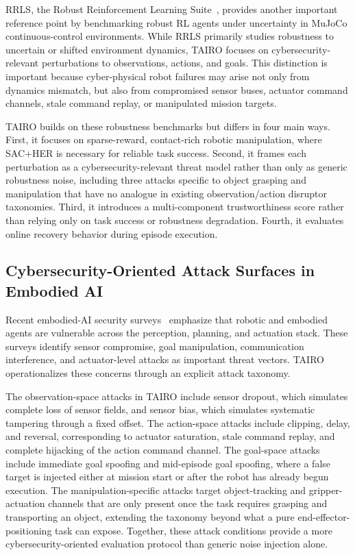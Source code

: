 \documentclass[conference]{IEEEtran}
\begin{document}
RRLS, the Robust Reinforcement Learning Suite~\cite{zouitine2024rrls}, provides another
important reference point by benchmarking robust RL agents under uncertainty in MuJoCo
continuous-control environments. While RRLS primarily studies robustness to uncertain or
shifted environment dynamics, TAIRO focuses on cybersecurity-relevant perturbations to
observations, actions, and goals. This distinction is important because cyber-physical
robot failures may arise not only from dynamics mismatch, but also from compromised
sensor buses, actuator command channels, stale command replay, or manipulated mission
targets.

TAIRO builds on these robustness benchmarks but differs in four main ways. First, it
focuses on sparse-reward, contact-rich robotic manipulation, where SAC+HER is necessary
for reliable task success. Second, it frames each perturbation as a cybersecurity-relevant
threat model rather than only as generic robustness noise, including three attacks
specific to object grasping and manipulation that have no analogue in existing
observation/action disruptor taxonomies. Third, it introduces a multi-component
trustworthiness score rather than relying only on task success or robustness
degradation. Fourth, it evaluates online recovery behavior during episode execution.

\subsection{Cybersecurity-Oriented Attack Surfaces in Embodied AI}

Recent embodied-AI security surveys~\cite{xing2025robustembodied} emphasize that
robotic and embodied agents are vulnerable across the perception, planning, and
actuation stack. These surveys identify sensor compromise, goal manipulation,
communication interference, and actuator-level attacks as important threat vectors.
TAIRO operationalizes these concerns through an explicit attack taxonomy.

The observation-space attacks in TAIRO include sensor dropout, which simulates complete
loss of sensor fields, and sensor bias, which simulates systematic tampering through a
fixed offset. The action-space attacks include clipping, delay, and reversal,
corresponding to actuator saturation, stale command replay, and complete hijacking of
the action command channel. The goal-space attacks include immediate goal spoofing and
mid-episode goal spoofing, where a false target is injected either at mission start or
after the robot has already begun execution. The manipulation-specific attacks target
object-tracking and gripper-actuation channels that are only present once the task
requires grasping and transporting an object, extending the taxonomy beyond what a
pure end-effector-positioning task can expose. Together, these attack conditions provide
a more cybersecurity-oriented evaluation protocol than generic noise injection alone.
\end{document}
